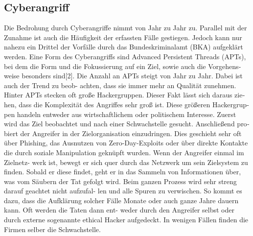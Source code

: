 \begin{otherlanguage}{ngerman}
\subsection{Cyberangriff}
Die Bedrohung durch Cyberangriffe nimmt von Jahr zu Jahr zu. Parallel mit der Zunahme ist auch die Häufigkeit der erfassten Fälle gestiegen. Jedoch kann nur nahezu ein Drittel der Vorfälle durch das Bundeskriminalamt (BKA) aufgeklärt werden.\newline
Eine Form des Cyberangriffs sind Advanced Persistent Threads (APTs), bei dem die Form
und die Fokussierung auf ein Ziel, sowie auch die Vorgehensweise besonders
sind[2]. Die Anzahl an APTs steigt von Jahr zu Jahr. Dabei ist auch der Trend zu beob-
achten, dass sie immer mehr an Qualität zunehmen. Hinter APTs stecken oft große Hackergruppen. Dieser Fakt lässt sich daraus ziehen, dass die Komplexität des Angriffes sehr groß ist. Diese größeren Hackergruppen handeln entweder aus wirtschaftlichem oder politischem Interesse. \newline
Zuerst wird das Ziel beobachtet und nach einer Schwachstelle gesucht. Anschließend
probiert der Angreifer in der Zielorganisation einzudringen. Dies geschieht sehr oft
über Phishing, das Ausnutzen von Zero-Day-Exploits oder über direkte Kontakte die
durch soziale Manipulation geknüpft wurden. Wenn der Angreifer einmal im Zielnetz-
werk ist, bewegt er sich quer durch das Netzwerk um sein Zielsystem zu finden. Sobald
er diese findet, geht er in das Sammeln von Informationen über, was vom Säubern der
Tat gefolgt wird. Beim ganzen Prozess wird sehr streng darauf geachtet nicht aufzufal-
len und alle Spuren zu verwischen. So kommt es dazu, dass die Aufklärung solcher
Fälle Monate oder auch ganze Jahre dauern kann. Oft werden die Taten dann ent-
weder durch den Angreifer selbst oder durch externe sogenannte \dq ethical Hacker \dq{} aufgedeckt. In
wenigen Fällen finden die Firmen selber die Schwachstelle.
\end{otherlanguage}
